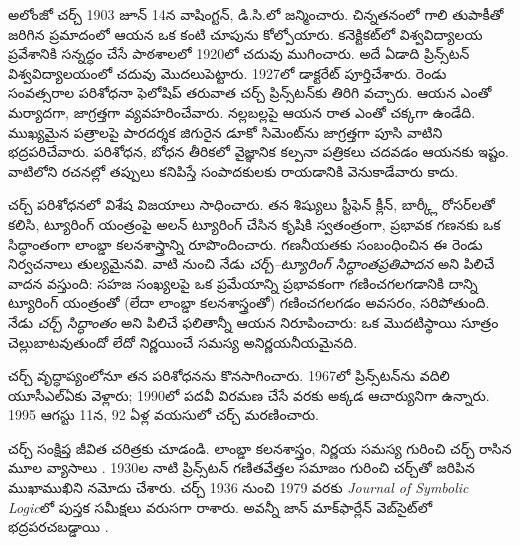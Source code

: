\documentclass[../../../include/open-logic-section]{subfiles}
\begin{document}



అలోంజో చర్చ్ 1903 జూన్ 14న వాషింగ్టన్, డి.సి.లో జన్మించారు. చిన్నతనంలో గాలి తుపాకీతో జరిగిన ప్రమాదంలో ఆయన ఒక కంటి చూపును కోల్పోయారు. కనెక్టికట్‌లో విశ్వవిద్యాలయ ప్రవేశానికి సన్నద్ధం చేసే పాఠశాలలో
1920లో చదువు ముగించారు. అదే ఏడాది ప్రిన్స్‌టన్
విశ్వవిద్యాలయంలో చదువు మొదలుపెట్టారు. 1927లో డాక్టరేట్ పూర్తిచేశారు. రెండు సంవత్సరాల పరిశోధనా ఫెలోషిప్‌ తరువాత చర్చ్ ప్రిన్స్‌టన్‌కు తిరిగి వచ్చారు. ఆయన ఎంతో మర్యాదగా, జాగ్రత్తగా వ్యవహరించేవారు. నల్లబల్లపై ఆయన రాత ఎంతో చక్కగా ఉండేది. ముఖ్యమైన పత్రాలపై
పారదర్శక జిగురైన డూకో సిమెంట్‌ను జాగ్రత్తగా పూసి వాటిని
భద్రపరిచేవారు. పరిశోధన, బోధన తీరికలో వైజ్ఞానిక కల్పనా పత్రికలు చదవడం ఆయనకు
ఇష్టం. వాటిలోని రచనల్లో తప్పులు కనిపిస్తే సంపాదకులకు
రాయడానికి వెనుకాడేవారు కాదు.

చర్చ్ పరిశోధనలో విశేష విజయాలు సాధించారు. తన శిష్యులు స్టీఫెన్ క్లీన్, బార్క్లీ రోసర్‌లతో కలిసి, ట్యూరింగ్ యంత్రంపై అలన్ ట్యూరింగ్ చేసిన కృషికి స్వతంత్రంగా, ప్రభావక గణనకు ఒక సిద్ధాంతంగా లాంబ్డా కలనశాస్త్రాన్ని
రూపొందించారు. గణనీయతకు సంబంధించిన ఈ రెండు నిర్వచనాలు తుల్యమైనవి. వాటి నుంచి నేడు \emph{చర్చ్--ట్యూరింగ్ సిద్ధాంతప్రతిపాదన} అని పిలిచే వాదన వస్తుంది: సహజ సంఖ్యలపై ఒక ప్రమేయాన్ని ప్రభావకంగా గణించగలగడానికి
దాన్ని ట్యూరింగ్ యంత్రంతో (లేదా లాంబ్డా కలనశాస్త్రంతో)
గణించగలగడం అవసరం, సరిపోతుంది. నేడు \emph{చర్చ్ సిద్ధాంతం} అని పిలిచే ఫలితాన్నీ ఆయన నిరూపించారు: ఒక మొదటిస్థాయి సూత్రం చెల్లుబాటవుతుందో లేదో నిర్ణయించే సమస్య అనిర్ణయనీయమైనది.

చర్చ్ వృద్ధాప్యంలోనూ తన పరిశోధనను కొనసాగించారు. 1967లో ప్రిన్స్‌టన్‌ను వదిలి యూసీఎల్‌ఏకు వెళ్లారు; 1990లో పదవీ విరమణ చేసే వరకు అక్కడ ఆచార్యునిగా ఉన్నారు. 1995 ఆగస్టు 11న, 92 ఏళ్ల వయసులో చర్చ్ మరణించారు.

\begin{reading}
చర్చ్ సంక్షిప్త జీవిత చరిత్రకు \citet{EndertonND} చూడండి. లాంబ్డా కలనశాస్త్రం, నిర్ణయ సమస్య గురించి చర్చ్ రాసిన మూల వ్యాసాలు \citet{Church1936,Church1936a}. 1930ల నాటి ప్రిన్స్‌టన్ గణితవేత్తల సమాజం గురించి చర్చ్‌తో జరిపిన ముఖాముఖిని \citet{Aspray1984} నమోదు చేశారు. చర్చ్ 1936 నుంచి 1979 వరకు \emph{Journal of
Symbolic Logic}లో పుస్తక సమీక్షలు వరుసగా రాశారు. అవన్నీ జాన్ మాక్‌ఫార్లేన్ వెబ్‌సైట్‌లో భద్రపరచబడ్డాయి \citep{MacFarlane2015}.
\end{reading}
\end{document}
